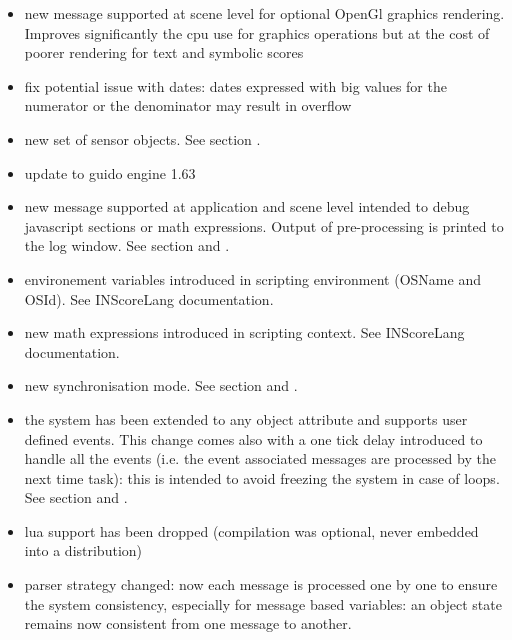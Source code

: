 \begin{itemize}
\item new  message supported at scene level for optional OpenGl graphics rendering. Improves significantly the cpu use for graphics operations but at the cost of poorer rendering for text and symbolic scores 
\item fix potential issue with dates: dates expressed with big values for the numerator or the denominator may result in overflow
\end{itemize}

\begin{itemize}
\item new set of sensor objects. See section .
\item update to guido engine 1.63
\item new  message supported at application and scene level intended to debug javascript sections or math expressions. Output of pre-processing is printed to the log window. See section  and  .
\item environement variables introduced in scripting environment (OSName and OSId). See INScoreLang documentation.
\item new math expressions introduced in scripting context. See INScoreLang documentation.
\item new  synchronisation mode. See section  and .
\item the  system has been extended to any object attribute and supports user defined events.
  This change comes also with a one tick delay introduced to handle all the events (i.e. the 
  event associated messages are processed by the next time task): this is intended to avoid
  freezing the system in case of loops. See section  and  .
\item lua support has been dropped (compilation was optional, never embedded into a distribution)
\item parser strategy changed: now each message is processed one by one to ensure the system
  consistency, especially for message based variables: an object state remains now consistent 
  from one message to another.

\end{itemize}

